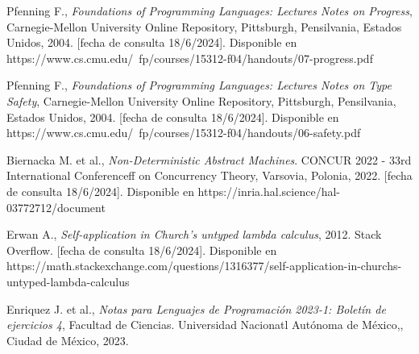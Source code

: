 \begin{thebibliography}{11}
    \bibitem{}
    \label{sec:117}
    \hypertarget{117}{}
    Pfenning F., \textit{Foundations of Programming Languages: Lectures Notes on Progress}, Carnegie-Mellon University Online Repository, Pittsburgh, Pensilvania, Estados Unidos, 2004.  [fecha de consulta 18/6/2024]. Disponible en https://www.cs.cmu.edu/~fp/courses/15312-f04/handouts/07-progress.pdf

    \bibitem{}
    \label{sec:118}
    \hypertarget{118}{}
    Pfenning F., \textit{Foundations of Programming Languages: Lectures Notes on Type Safety}, Carnegie-Mellon University Online Repository, Pittsburgh, Pensilvania, Estados Unidos, 2004.  [fecha de consulta 18/6/2024]. Disponible en https://www.cs.cmu.edu/~fp/courses/15312-f04/handouts/06-safety.pdf

    \bibitem{}
    \label{sec:119}
    \hypertarget{119}{}
    Biernacka M. et al., \textit{Non-Deterministic Abstract Machines}. CONCUR 2022 - 33rd International Conferenceff on Concurrency Theory, Varsovia, Polonia, 2022.  [fecha de consulta 18/6/2024]. Disponible en  https://inria.hal.science/hal-03772712/document


    \bibitem{}
    \label{sec:120}
    \hypertarget{120}{}
    Erwan A., \textit{Self-application in Church's untyped lambda calculus}, 2012. Stack Overflow. [fecha de consulta 18/6/2024]. Disponible en https://math.stackexchange.com/questions/1316377/self-application-in-churchs-untyped-lambda-calculus

    \bibitem{}
    \label{sec:121}
    \hypertarget{121}{}
    Enriquez J. et al., \textit{Notas  para Lenguajes de Programación 2023-1: Boletín de ejercicios 4}, Facultad de Ciencias. Universidad Nacionatl Autónoma de México,, Ciudad de México, 2023.


\end{thebibliography}